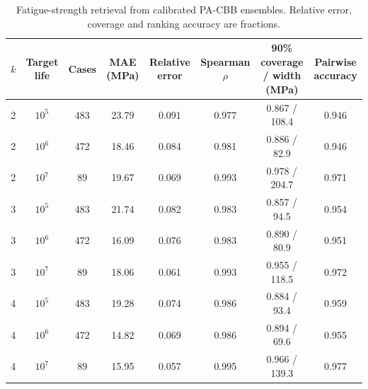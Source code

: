 \begin{table}[t]
\caption{Fatigue-strength retrieval from calibrated PA-CBB ensembles. Relative error, coverage and ranking accuracy are fractions.}
\label{tab:downstream_strength}
\centering
\scriptsize
\setlength{\tabcolsep}{4pt}
\begin{tabular}{cccccccc}
\toprule
$k$ & Target life & Cases & MAE (MPa) & Relative error & Spearman $\rho$ & 90\% coverage / width (MPa) & Pairwise accuracy \\
\midrule
2 & $10^{5}$ & 483 & 23.79 & 0.091 & 0.977 & 0.867 / 108.4 & 0.946 \\
2 & $10^{6}$ & 472 & 18.46 & 0.084 & 0.981 & 0.886 / 82.9 & 0.946 \\
2 & $10^{7}$ & 89 & 19.67 & 0.069 & 0.993 & 0.978 / 204.7 & 0.971 \\
3 & $10^{5}$ & 483 & 21.74 & 0.082 & 0.983 & 0.857 / 94.5 & 0.954 \\
3 & $10^{6}$ & 472 & 16.09 & 0.076 & 0.983 & 0.890 / 80.9 & 0.951 \\
3 & $10^{7}$ & 89 & 18.06 & 0.061 & 0.993 & 0.955 / 118.5 & 0.972 \\
4 & $10^{5}$ & 483 & 19.28 & 0.074 & 0.986 & 0.884 / 93.4 & 0.959 \\
4 & $10^{6}$ & 472 & 14.82 & 0.069 & 0.986 & 0.894 / 69.6 & 0.955 \\
4 & $10^{7}$ & 89 & 15.95 & 0.057 & 0.995 & 0.966 / 139.3 & 0.977 \\
\bottomrule
\end{tabular}
\end{table}
